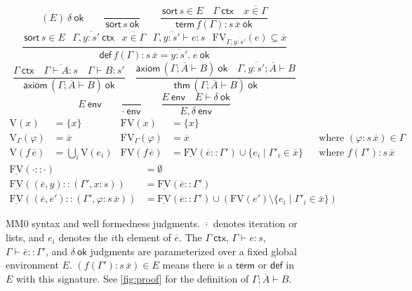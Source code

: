 \documentclass[runningheads]{llncs}
\newcommand{\ctx}{\ \mathsf{ctx}}
\newcommand{\ok}{\ \mathsf{ok}}
\newcommand{\sort}{\,\mathsf{sort}}
\newcommand{\env}{\ \mathsf{env}}
\begin{document}
\begin{figure}
  $$\boxed{(E)\ \delta\ok}\qquad\dfrac{}{\sort\,s\ok}\qquad
  \dfrac{\sort\,s\in E\quad \Gamma\ctx\quad \overline{x\in\Gamma}}{\mathsf{term}\,f(\Gamma):s\,\overline{x}\ok}$$\vspace{1pt}
  $$\dfrac{\sort\,s\in E\hspace{9pt} \Gamma,\overline{y:s'}\ctx\hspace{9pt} \overline{x\in\Gamma}\hspace{9pt} \Gamma,\overline{y:s'}\vdash e:s\hspace{9pt} \mathrm{FV}_{\Gamma,\overline{y:s'}}(e)\subseteq\overline{x}}{\mathsf{def}\,f(\Gamma): s\,\overline{x}=\overline{y:s'}.\;e\ok}$$\vspace{1pt}
  $$\dfrac{\Gamma\ctx\quad \overline{\Gamma\vdash A:s}\quad \Gamma\vdash B:s'}{\mathsf{axiom}\,(\Gamma;\overline{A}\vdash B)\ok}\quad
  \dfrac{\mathsf{axiom}\,(\Gamma;\overline{A}\vdash B)\ok\quad \Gamma,\overline{y:s'};\overline{A}\vdash B}{\mathsf{thm}\,(\Gamma;\overline{A}\vdash B)\ok}$$\vspace{3pt}
  $$\boxed{E\env}\qquad\dfrac{}{\cdot\env}\qquad
  \dfrac{E\env\quad E\vdash\delta\ok}{E,\delta\env}$$
  \begin{align*}
    \mathrm{V}(x)&=\{x\}&
    \mathrm{FV}(x)&=\{x\}\\
    \mathrm{V}_\Gamma(\varphi)&=\overline{x}&
    \mathrm{FV}_\Gamma(\varphi)&=\overline{x}&&\mbox{where $(\varphi:s\,\overline{x})\in\Gamma$}\\
    \mathrm{V}(f\,\overline{e})&=\textstyle{\bigcup_i\mathrm{V}(e_i)}&
    \mathrm{FV}(f\,\overline{e})&=\underline{\mathrm{FV}}(\overline{e}::\Gamma')\cup \{e_i\mid \Gamma'_i\in \overline{x}\}&&\mbox{where $f(\Gamma'):s\,\overline{x}$}
  \end{align*}
  \begin{align*}
    \underline{\mathrm{FV}}(\cdot::\cdot)&=\emptyset\\
    \underline{\mathrm{FV}}((\overline{e},y)::(\Gamma',x:s))&=\underline{\mathrm{FV}}(\overline{e}::\Gamma')\\
    \underline{\mathrm{FV}}((\overline{e},e')::(\Gamma',\varphi:s\,\overline{x}))&=\underline{\mathrm{FV}}(\overline{e}::\Gamma')\cup(\mathrm{FV}(e')\setminus\{e_i\mid \Gamma'_i\in \overline{x}\})
  \end{align*}
  \caption{MM0 syntax and well formedness judgments. $\overline{\cdot}$ denotes iteration or lists, and $e_i$ denotes the $i$th element of $\overline{e}$. The $\Gamma\ctx$, $\Gamma\vdash e:s$, $\Gamma\vdash \overline{e}::\Gamma'$, and $\delta\ok$ judgments are parameterized over a fixed global environment $E$. $(f(\Gamma'):s\,\overline{x})\in E$ means there is a $\mathsf{term}$ or $\mathsf{def}$ in $E$ with this signature. See \autoref{fig:proof} for the definition of $\Gamma;\overline{A}\vdash B$.}
  \label{fig:rules}
\end{figure}
\end{document}

